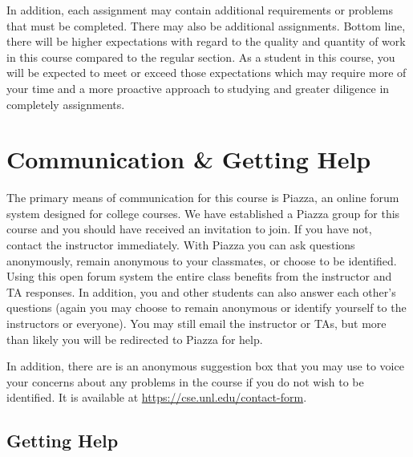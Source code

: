 \documentclass[12pt]{scrartcl}
\begin{document}
In addition, each assignment may contain additional requirements or 
problems that must be completed.  There may also be additional 
assignments.  Bottom line, there will be higher expectations with 
regard to the quality and quantity of work in this course compared 
to the regular section.  As a student in this course, you will be 
expected to meet or exceed those expectations which may require more 
of your time and a more proactive approach to studying and greater 
diligence in completely assignments.  

\section{Communication \& Getting Help}

The primary means of communication for this course is Piazza, an online
forum system designed for college courses.  We have established a Piazza 
group for this course and you should have received an invitation to join.
If you have not, contact the instructor immediately.  With Piazza you 
can ask questions anonymously, remain anonymous to your classmates, or 
choose to be identified.  Using this open forum system the entire class 
benefits from the instructor and TA responses.  In addition, you and 
other students can also answer each other's questions (again you may
choose to remain anonymous or identify yourself to the instructors or
everyone).  You may still email the instructor or TAs, but more than 
likely you will be redirected to Piazza for help.

In addition, there are is an anonymous suggestion box that you may 
use to voice your concerns about any problems in the course if you 
do not wish to be identified. It is available at 
\url{https://cse.unl.edu/contact-form}.

\subsection{Getting Help}
\end{document}
